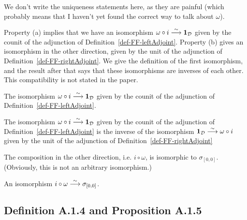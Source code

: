 We don't write the uniqueness statements here, as they are painful (which probably means
that I haven't yet found the correct way to talk about $\omega$).

Property (a) implies that we have an isomorphism $\omega\circ i \stackrel{\sim}{\longrightarrow} {\mathbf{1}}_{\mathcal{D}}$ given by the
counit of the adjunction of Definition~\ref{def-FF-leftAdjoint}.
Property (b) gives an isomorphism in the other direction, given by the unit of the adjunction of
Definition~\ref{def-FF-rightAdjoint}.
We give the definition of the first
isomorphism,
and the result after that
says that these isomorphisms are inverses of each other. This compatibility is not stated 
in the paper.

\begin{definition}
\label{def-FF-i}

The isomorphism $\omega\circ i \stackrel{\sim}{\longrightarrow} {\mathbf{1}}_{\mathcal{D}}$ given by the
counit of the adjunction of Definition~\ref{def-FF-leftAdjoint}.

\end{definition}

\begin{proposition}
\label{prop-FF-compat}

The isomorphism $\omega\circ i \stackrel{\sim}{\longrightarrow} {\mathbf{1}}_{\mathcal{D}}$ given by the
counit of the adjunction of Definition~\ref{def-FF-leftAdjoint} is the 
inverse of the isomorphism ${\mathbf{1}}_{\mathcal{D}}\stackrel{\sim}{\longrightarrow}\omega\circ i$ given by the
unit of the adjunction of Definition~\ref{def-FF-rightAdjoint}

\end{proposition}

The composition in the other direction, i.e. $i\circ\omega$, is isomorphic to $\sigma_{[0,0]}$.
(Obviously, this is not an arbitrary isomorphism.)

\begin{definition}
\label{def-i-FF}

An isomorphism $i\circ\omega\stackrel{\sim}{\longrightarrow}\sigma_{[0,0]}$.

\end{definition}


\subsection{Definition A.1.4 and Proposition A.1.5}


